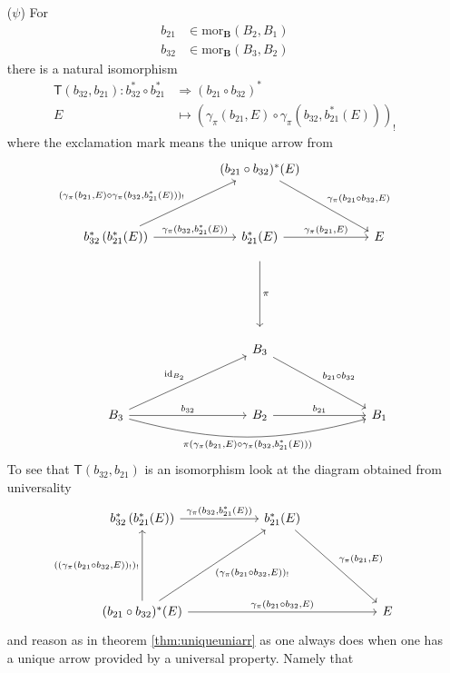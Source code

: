 \begin{enumerate}
\item[($\psi$)]
For
\begin{align*}
  b_{21}
  &\in
  \mathrm{mor}_{\mathbf{B}}(B_{2},B_{1})
  \\
  b_{32}
  &\in
  \mathrm{mor}_{\mathbf{B}}(B_{3},B_{2})
\end{align*}
there is a natural isomorphism
\begin{align*}
  \mathsf{T}(b_{32},b_{21})
  \colon
  b_{32}^{\ast}
  \circ
  b_{21}^{\ast}
  &\Rightarrow
  \left(
    b_{21}
    \circ
    b_{32}
  \right)^{\ast}
  \\
  E
  &\mapsto
  \left(
    \gamma_{\pi}(b_{21},E)
    \circ
    \gamma_{\pi}(b_{32},b_{21}^{\ast}(E))
  \right)_{!}
\end{align*}
where the exclamation mark means the unique arrow from
\[
\begin{tikzcd}[sep=huge]
  &
  (b_{21} \circ b_{32})^{\ast}(E)
  \arrow{dr}{\gamma_{\pi}(b_{21} \circ b_{32},E)}
  &
  \\
  b_{32}^{\ast}
  \left(
    b_{21}^{\ast}(E)
  \right)
  \arrow{ur}{(\gamma_{\pi}(b_{21},E) \circ \gamma_{\pi}(b_{32},b_{21}^{\ast}(E)))_{!}}
  \arrow{r}{\gamma_{\pi}(b_{32},b_{21}^{\ast}(E))}
  &
  b_{21}^{\ast}(E)
  \arrow{r}{\gamma_{\pi}(b_{21},E)}
  \arrow[shorten <= 10pt, shorten >= 10pt]{dd}{\pi}
  &
  E
  \\
  &
  &
  \\
  &
  B_{3}
  \arrow{dr}{b_{21} \circ b_{32}}
  &
  \\
  B_{3}
  \arrow{ur}{\mathrm{id}_{B_{2}}}
  \arrow{r}{b_{32}}
  \arrow[swap,bend right=15]{rr}{\pi(\gamma_{\pi}(b_{21},E) \circ \gamma_{\pi}(b_{32},b_{21}^{\ast}(E)))}
  &
  B_{2}
  \arrow{r}{b_{21}}
  &
  B_{1}
\end{tikzcd}
\]
To see that $\mathsf{T}(b_{32},b_{21})$ is an isomorphism look at the diagram obtained from universality
\[
\begin{tikzcd}[row sep=13ex,column sep=13ex]
  b_{32}^{\ast}
  \left(
    b_{21}^{\ast}(E)
  \right)
  \arrow{r}{\gamma_{\pi}(b_{32},b_{21}^{\ast}(E))}
  &
  b_{21}^{\ast}(E)
  \arrow{dr}{\gamma_{\pi}(b_{21},E)}
  &
  \\
  (b_{21} \circ b_{32})^{\ast}(E)
  \arrow{u}{((\gamma_{\pi}(b_{21} \circ b_{32},E))_{!})_{!}}
  \arrow[swap]{ur}{(\gamma_{\pi}(b_{21} \circ b_{32},E))_{!}}
  \arrow{rr}{\gamma_{\pi}(b_{21} \circ b_{32},E)}
  &
  &
  E
\end{tikzcd}
\]
and reason as in theorem \ref{thm:uniqueuniarr} as one always does when one has a unique arrow provided by a universal property. Namely that

\end{enumerate}
